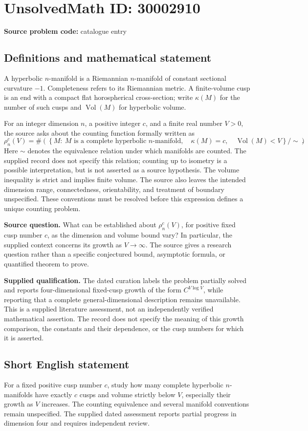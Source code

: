 \documentclass[11pt]{article}
\begin{document}
\section*{UnsolvedMath ID: 30002910}
\textbf{Source problem code:} catalogue entry
\subsection{Definitions and mathematical statement}
A hyperbolic \(n\)-manifold is a Riemannian \(n\)-manifold of constant sectional curvature \(-1\). Completeness refers to its Riemannian metric. A finite-volume cusp is an end with a compact flat horospherical cross-section; write \(\kappa(M)\) for the number of such cusps and \(\operatorname{Vol}(M)\) for hyperbolic volume.

For an integer dimension \(n\), a positive integer \(c\), and a finite real number \(V>0\), the source asks about the counting function formally written as
\[
\rho_n^c(V)=
\#\left(
\left\{M:\ M\text{ is a complete hyperbolic }n\text{-manifold},\quad
\kappa(M)=c,\quad \operatorname{Vol}(M)<V\right\}/\!\sim
\right).
\]
Here \(\sim\) denotes the equivalence relation under which manifolds are counted. The supplied record does not specify this relation; counting up to isometry is a possible interpretation, but is not asserted as a source hypothesis. The volume inequality is strict and implies finite volume. The source also leaves the intended dimension range, connectedness, orientability, and treatment of boundary unspecified. These conventions must be resolved before this expression defines a unique counting problem.

\textbf{Source question.} What can be established about \(\rho_n^c(V)\), for positive fixed cusp number \(c\), as the dimension and volume bound vary? In particular, the supplied context concerns its growth as \(V\to\infty\). The source gives a research question rather than a specific conjectured bound, asymptotic formula, or quantified theorem to prove.

\textbf{Supplied qualification.} The dated curation labels the problem partially solved and reports four-dimensional fixed-cusp growth of the form \(C^{V\log V}\), while reporting that a complete general-dimensional description remains unavailable. This is a supplied literature assessment, not an independently verified mathematical assertion. The record does not specify the meaning of this growth comparison, the constants and their dependence, or the cusp numbers for which it is asserted.
\subsection{Short English statement}
For a fixed positive cusp number \(c\), study how many complete hyperbolic \(n\)-manifolds have exactly \(c\) cusps and volume strictly below \(V\), especially their growth as \(V\) increases. The counting equivalence and several manifold conventions remain unspecified. The supplied dated assessment reports partial progress in dimension four and requires independent review.
\end{document}
